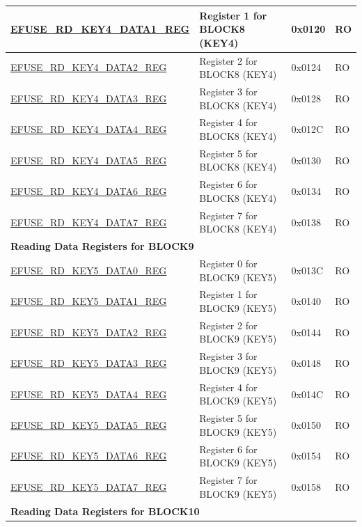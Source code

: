 \begin{longtable}{ | p{7.2cm} | p{6cm} | p{1.3cm} | p{1cm} | }
\hyperref[regdesc:EFUSERDKEY4DATANREG]{EFUSE\_RD\_KEY4\_DATA1\_REG} & Register 1 for BLOCK8 (KEY4) & 0x0120 & RO \\ \hline
\hyperref[regdesc:EFUSERDKEY4DATANREG]{EFUSE\_RD\_KEY4\_DATA2\_REG} & Register 2 for BLOCK8 (KEY4) & 0x0124 & RO \\ \hline
\hyperref[regdesc:EFUSERDKEY4DATANREG]{EFUSE\_RD\_KEY4\_DATA3\_REG} & Register 3 for BLOCK8 (KEY4) & 0x0128 & RO \\ \hline
\hyperref[regdesc:EFUSERDKEY4DATANREG]{EFUSE\_RD\_KEY4\_DATA4\_REG} & Register 4 for BLOCK8 (KEY4) & 0x012C & RO \\ \hline
\hyperref[regdesc:EFUSERDKEY4DATANREG]{EFUSE\_RD\_KEY4\_DATA5\_REG} & Register 5 for BLOCK8 (KEY4) & 0x0130 & RO \\ \hline
\hyperref[regdesc:EFUSERDKEY4DATANREG]{EFUSE\_RD\_KEY4\_DATA6\_REG} & Register 6 for BLOCK8 (KEY4) & 0x0134 & RO \\ \hline
\hyperref[regdesc:EFUSERDKEY4DATANREG]{EFUSE\_RD\_KEY4\_DATA7\_REG} & Register 7 for BLOCK8 (KEY4) & 0x0138 & RO \\ \hline
\multicolumn{4}{|l|}{\textbf{Reading Data Registers for BLOCK9}} \\ \hline
\hyperref[regdesc:EFUSERDKEY5DATANREG]{EFUSE\_RD\_KEY5\_DATA0\_REG} & Register 0 for BLOCK9 (KEY5) & 0x013C & RO \\ \hline
\hyperref[regdesc:EFUSERDKEY5DATANREG]{EFUSE\_RD\_KEY5\_DATA1\_REG} & Register 1 for BLOCK9 (KEY5) & 0x0140 & RO \\ \hline
\hyperref[regdesc:EFUSERDKEY5DATANREG]{EFUSE\_RD\_KEY5\_DATA2\_REG} & Register 2 for BLOCK9 (KEY5) & 0x0144 & RO \\ \hline
\hyperref[regdesc:EFUSERDKEY5DATANREG]{EFUSE\_RD\_KEY5\_DATA3\_REG} & Register 3 for BLOCK9 (KEY5) & 0x0148 & RO \\ \hline
\hyperref[regdesc:EFUSERDKEY5DATANREG]{EFUSE\_RD\_KEY5\_DATA4\_REG} & Register 4 for BLOCK9 (KEY5) & 0x014C & RO \\ \hline
\hyperref[regdesc:EFUSERDKEY5DATANREG]{EFUSE\_RD\_KEY5\_DATA5\_REG} & Register 5 for BLOCK9 (KEY5) & 0x0150 & RO \\ \hline
\hyperref[regdesc:EFUSERDKEY5DATANREG]{EFUSE\_RD\_KEY5\_DATA6\_REG} & Register 6 for BLOCK9 (KEY5) & 0x0154 & RO \\ \hline
\hyperref[regdesc:EFUSERDKEY5DATANREG]{EFUSE\_RD\_KEY5\_DATA7\_REG} & Register 7 for BLOCK9 (KEY5) & 0x0158 & RO \\ \hline
\multicolumn{4}{|l|}{\textbf{Reading Data Registers for BLOCK10}} \\ \hline

\end{longtable}

